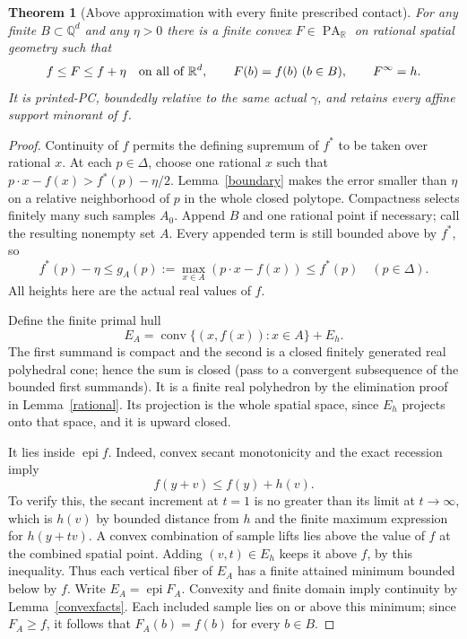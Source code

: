 \documentclass[11pt]{article}
\newtheorem{theorem}{Theorem}
\newcommand{\R}{\mathbb R}
\newcommand{\Q}{\mathbb Q}
\newcommand{\PA}{\operatorname{PA}_{\R}}
\newcommand{\epi}{\operatorname{epi}}
\newcommand{\conv}{\operatorname{conv}}
\begin{document}
\begin{theorem}[Above approximation with every finite prescribed contact]\label{affine}
For any finite $B\subset\Q^d$ and any $\eta>0$ there is a finite convex $F\in\PA$ on rational spatial geometry such that
\[
 f\leq F\leq f+\eta\quad\hbox{on all of }\R^d,
 \qquad F(b)=f(b)\ (b\in B),\qquad F^\infty=h.
\]
It is printed-PC, boundedly relative to the same actual $\gamma$, and retains every affine support minorant of $f$.
\end{theorem}
\begin{proof}
Continuity of $f$ permits the defining supremum of $f^*$ to be taken over rational $x$. At each $p\in\Delta$, choose one rational $x$ such that $p\cdot x-f(x)>f^*(p)-\eta/2$. Lemma~\ref{boundary} makes the error smaller than $\eta$ on a relative neighborhood of $p$ in the whole closed polytope. Compactness selects finitely many such samples $A_0$. Append $B$ and one rational point if necessary; call the resulting nonempty set $A$. Every appended term is still bounded above by $f^*$, so
\begin{equation}\label{dualerror}
 f^*(p)-\eta\leq g_A(p):=\max_{x\in A}(p\cdot x-f(x))\leq f^*(p)
                  \quad(p\in\Delta).
\end{equation}
All heights here are the actual real values of $f$.

Define the finite primal hull
\[
 E_A=\conv\{(x,f(x)):x\in A\}+E_h.
\]
The first summand is compact and the second is a closed finitely generated real polyhedral cone; hence the sum is closed (pass to a convergent subsequence of the bounded first summands). It is a finite real polyhedron by the elimination proof in Lemma~\ref{rational}. Its projection is the whole spatial space, since $E_h$ projects onto that space, and it is upward closed.

It lies inside $\epi f$. Indeed, convex secant monotonicity and the exact recession imply
\[
 f(y+v)\leq f(y)+h(v).
\]
To verify this, the secant increment at $t=1$ is no greater than its limit at $t\to\infty$, which is $h(v)$ by bounded distance from $h$ and the finite maximum expression for $h(y+tv)$. A convex combination of sample lifts lies above the value of $f$ at the combined spatial point. Adding $(v,t)\in E_h$ keeps it above $f$, by this inequality. Thus each vertical fiber of $E_A$ has a finite attained minimum bounded below by $f$. Write $E_A=\epi F_A$. Convexity and finite domain imply continuity by Lemma~\ref{convexfacts}. Each included sample lies on or above this minimum; since $F_A\geq f$, it follows that $F_A(b)=f(b)$ for every $b\in B$.


\end{proof}
\end{document}
